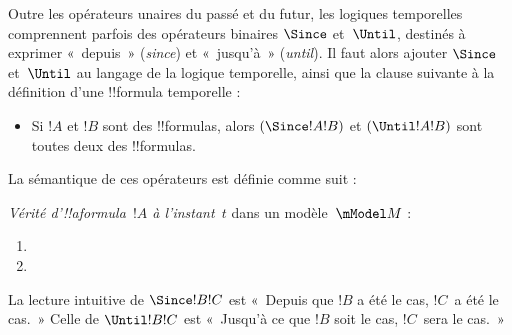 \documentclass[../../../include/open-logic-section]{subfiles}
\begin{document}


Outre les opérateurs unaires du passé et du futur, les logiques
temporelles comprennent parfois des opérateurs binaires $\Since $
et~$\Until$, destinés à exprimer «~depuis~» (\emph{since}) et
«~jusqu'à~» (\emph{until}). Il faut alors ajouter $\Since $ et~$\Until$
au langage de la logique temporelle, ainsi que la clause suivante à
la définition d'une !!{formula} temporelle :

\begin{itemize}
\item[] Si $!A$ et $!B$ sont des !!{formula}s, alors $(\Since  !A !B)$
  et $(\Until !A !B)$ sont toutes deux des !!{formula}s.
\end{itemize}

La sémantique de ces opérateurs est définie comme suit :

\begin{defn}
  \emph{Vérité d'!!a{formula}~$!A$ à l'instant~$t$} dans un modèle~$\mModel M$ :
  \begin{enumerate}
  \item{} 
  \item{} 
  \end{enumerate}
\end{defn}

La lecture intuitive de $\Since  !B !C$ est «~Depuis que $!B$ a été
le cas, $!C$~a été le cas.~» Celle de $\Until !B !C$ est «~Jusqu'à
ce que $!B$ soit le cas, $!C$~sera le cas.~»
\end{document}
